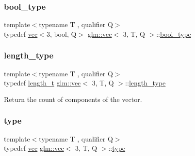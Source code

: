 \subsubsection{\texorpdfstring{bool\+\_\+type}{bool\_type}}
{\footnotesize\ttfamily template$<$typename T , qualifier Q$>$ \\
typedef \mbox{\hyperlink{structglm_1_1vec}{vec}}$<$3, bool, Q$>$ \mbox{\hyperlink{structglm_1_1vec}{glm\+::vec}}$<$ 3, T, Q $>$\+::\mbox{\hyperlink{structglm_1_1vec_3_013_00_01_t_00_01_q_01_4_a8574623d0fe3b330e18c10b8d5022ca6}{bool\+\_\+type}}}

\mbox{\label{structglm_1_1vec_3_013_00_01_t_00_01_q_01_4_ab586a87f82719bfdd180336a98843257}} 
\subsubsection{\texorpdfstring{length\+\_\+type}{length\_type}}
{\footnotesize\ttfamily template$<$typename T , qualifier Q$>$ \\
typedef \mbox{\hyperlink{namespaceglm_a090a0de2260835bee80e71a702492ed9}{length\+\_\+t}} \mbox{\hyperlink{structglm_1_1vec}{glm\+::vec}}$<$ 3, T, Q $>$\+::\mbox{\hyperlink{structglm_1_1vec_3_013_00_01_t_00_01_q_01_4_ab586a87f82719bfdd180336a98843257}{length\+\_\+type}}}



Return the count of components of the vector. 

\mbox{\label{structglm_1_1vec_3_013_00_01_t_00_01_q_01_4_aab5e53af2d54d8353fecdd9071c14560}} 
\subsubsection{\texorpdfstring{type}{type}}
{\footnotesize\ttfamily template$<$typename T , qualifier Q$>$ \\
typedef \mbox{\hyperlink{structglm_1_1vec}{vec}} \mbox{\hyperlink{structglm_1_1vec}{glm\+::vec}}$<$ 3, T, Q $>$\+::\mbox{\hyperlink{structglm_1_1vec_3_013_00_01_t_00_01_q_01_4_aab5e53af2d54d8353fecdd9071c14560}{type}}}

